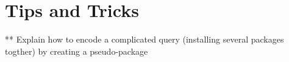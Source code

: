 \section{Tips and Tricks}
\label{sec:tricks}
** Explain how to encode a complicated query (installing several
packages togther) by creating a pseudo-package

